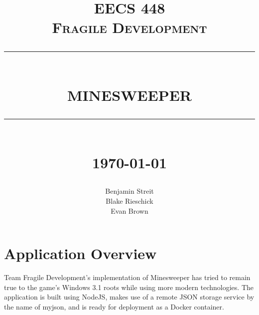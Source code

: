 \documentclass[12pt]{report}
\newcommand{\HRule}[1]{\rule{\linewidth}{#1}}
\begin{document}
\title{ \normalsize \textsc{EECS 448 \\ Fragile Development}
        \HRule{0.5pt} \\
        \LARGE \textbf{\uppercase{Minesweeper}}
        \HRule{2pt} \\ [0.5cm]
        \normalsize \today \vspace*{5\baselineskip}}

\date{}

\author{
        Benjamin Streit \\ 
        Blake Rieschick \\
        Evan Brown }

\maketitle
\newpage

%
%
\sectionfont{\scshape}

%
%

%
%
\section*{Application Overview}
Team Fragile Development's implementation of Minesweeper has tried to remain true to the game's Windows 3.1 roots while using more modern technologies. The application is built using NodeJS, makes use of a remote JSON storage service by the name of myjson, and is ready for deployment as a Docker container. 
\end{document}
